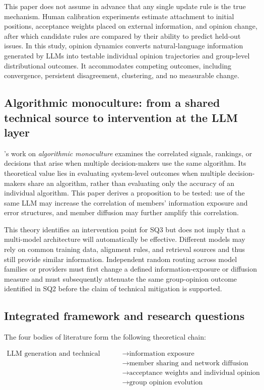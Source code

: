 \documentclass[11pt,a4paper]{article}
\newcommand{\term}[1]{\textit{#1}}
\begin{document}
This paper does not assume in advance that any single update rule is the true mechanism. Human calibration experiments estimate attachment to initial positions, acceptance weights placed on external information, and opinion change, after which candidate rules are compared by their ability to predict held-out issues. In this study, opinion dynamics converts natural-language information generated by LLMs into testable individual opinion trajectories and group-level distributional outcomes. It accommodates competing outcomes, including convergence, persistent disagreement, clustering, and no measurable change.

\subsection{Algorithmic monoculture: from a shared technical source to intervention at the LLM layer}

\citet{kleinberg2021}'s work on \term{algorithmic monoculture} examines the correlated signals, rankings, or decisions that arise when multiple decision-makers use the same algorithm. Its theoretical value lies in evaluating system-level outcomes when multiple decision-makers share an algorithm, rather than evaluating only the accuracy of an individual algorithm. This paper derives a proposition to be tested: use of the same LLM may increase the correlation of members' information exposure and error structures, and member diffusion may further amplify this correlation.

This theory identifies an intervention point for SQ3 but does not imply that a multi-model architecture will automatically be effective. Different models may rely on common training data, alignment rules, and retrieval sources and thus still provide similar information. Independent random routing across model families or providers must first change a defined information-exposure or diffusion measure and must subsequently attenuate the same group-opinion outcome identified in SQ2 before the claim of technical mitigation is supported.

\subsection{Integrated framework and research questions}

The four bodies of literature form the following theoretical chain:

\begin{equation*}
\begin{aligned}\text{LLM generation and technical configuration} &\rightarrow \text{information exposure} \\
&\rightarrow \text{member sharing and network diffusion} \\
&\rightarrow \text{acceptance weights and individual opinion updating} \\
&\rightarrow \text{group opinion evolution}\end{aligned}
\end{equation*}
\end{document}
